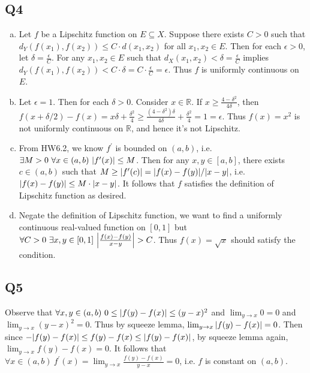 \documentclass[12pt,lettersize]{article}
\newcommand{\R}{\mathbb{R}}
\begin{document}
	\subsection*{Q4}
	\begin{enumerate}[(a)]
		\item Let $f$ be a Lipschitz function on $E\subseteq X$. Suppose there exists $C>0$ such that $d_Y(f(x_1),f(x_2))\leq C\cdot d(x_1,x_2)$ for all $x_1,x_2\in E$. Then for each $\epsilon>0$, let $\delta=\frac{\epsilon}{C}$. For any $x_1,x_2\in E$ such that $d_X(x_1,x_2)<\delta=\frac{\epsilon}{C}$ implies $d_Y(f(x_1),f(x_2))<C\cdot\delta=C\cdot\frac{\epsilon}{C}=\epsilon$. Thus $f$ is uniformly continuous on $E$.
		
		\item Let $\epsilon=1$. Then for each $\delta>0$. Consider $x\in\R$. If $x\geq\frac{4-\delta^2}{4\delta}$, then $f(x+\delta/2)-f(x)=x\delta+\frac{\delta^2}{4}\geq \frac{(4-\delta^2)\delta}{4\delta}+\frac{\delta^2}{4}=1=\epsilon$. Thus $f(x)=x^2$ is not uniformly continuous on $\R$, and hence it's not Lipschitz.
		
		\item From HW6.2, we know $f^\prime$ is bounded on $(a,b)$, i.e. $\exists M>0\ \forall x\in(a,b)\ \abs{f^\prime(x)}\leq M$. Then for any $x,y\in[a,b]$, there exists $c\in(a,b)$ such that $M\geq \abs{f^\prime(c)}=\abs{f(x)-f(y)}/\abs{x-y}$, i.e. $\abs{f(x)-f(y)}\leq M\cdot\abs{x-y}$. It follows that $f$ satisfies the definition of Lipschitz function as desired.
		
		\item Negate the definition of Lipschitz function, we want to find a uniformly continuous real-valued function on $[0,1]$ but $\forall C>0\ \exists x,y\in[0,1]\ \abs{\frac{f(x)-f(y)}{x-y}}>C$. Thus $f(x)=\sqrt{x}$ should satisfy the condition.
	\end{enumerate}
	\newpage
	
	\subsection*{Q5}
	Observe that $\forall x,y\in(a,b)\ 0\leq\abs{f(y)-f(x)}\leq(y-x)^2$ and $\lim_{y\rightarrow x}0=0$ and $\lim_{y\rightarrow x}(y-x)^2=0$. Thus by squeeze lemma, $\lim_{y\rightarrow x}\abs{f(y)-f(x)}=0$. Then since $-\abs{f(y)-f(x)}\leq f(y)-f(x)\leq\abs{f(y)-f(x)}$, by squeeze lemma again, $\lim_{y\rightarrow x}f(y)-f(x)=0$. It follows that $\forall x\in(a,b)\ f^\prime(x)=\lim_{y\rightarrow x}\frac{f(y)-f(x)}{y-x}=0$, i.e. $f$ is constant on $(a,b)$. 
	\newpage
	
\end{document}
